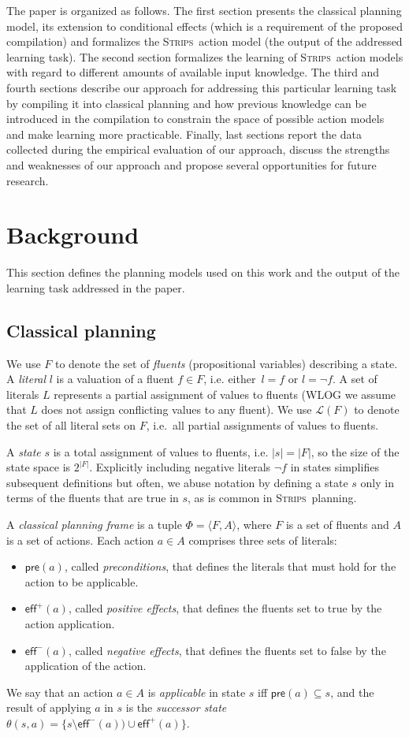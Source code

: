 \documentclass[letterpaper]{article} %
\newcommand{\tup}[1]{{\langle #1 \rangle}}
\newcommand{\pre}{\mathsf{pre}}     %
\newcommand{\eff}{\mathsf{eff}}     %
\newcommand{\strips}{\textsc{Strips}}     %
\begin{document}
The paper is organized as follows. The first section presents the classical planning model, its extension to conditional effects (which is a requirement of the proposed compilation) and formalizes the \strips\ action model (the output of the addressed learning task). The second section formalizes the learning of \strips\ action models with regard to different amounts of available input knowledge. The third and fourth sections describe our approach for addressing this particular learning task by compiling it into classical planning and how previous knowledge can be introduced in the compilation to constrain the space of possible action models and make learning more practicable. Finally, last sections report the data collected during the empirical evaluation of our approach, discuss the strengths and weaknesses of our approach and propose several opportunities for future research.


\section{Background}
This section defines the planning models used on this work and the output of the learning task addressed in the paper.

\subsection{Classical planning}
We use $F$ to denote the set of {\em fluents} (propositional variables) describing a state. A {\em literal} $l$ is a valuation of a fluent $f\in F$, i.e. either~$l=f$ or $l=\neg f$. A set of literals $L$ represents a partial assignment of values to fluents (WLOG we assume that $L$ does not assign conflicting values to any fluent). We use $\mathcal{L}(F)$ to denote the set of all literal sets on $F$, i.e.~all partial assignments of values to fluents.

A {\em state} $s$ is a total assignment of values to fluents, i.e. $|s|=|F|$, so the size of the state space is $2^{|F|}$. Explicitly including negative literals $\neg f$ in states simplifies subsequent definitions but often, we abuse notation by defining a state $s$ only in terms of the fluents that are true in $s$, as is common in \strips\ planning.

A {\em classical planning frame} is a tuple $\Phi=\tup{F,A}$, where $F$ is a set of fluents and $A$ is a set of actions. Each action $a\in A$ comprises three sets of literals:
\begin{itemize}
\item $\pre(a)$, called {\em preconditions}, that defines the literals that must hold for the action to be applicable.
\item $\eff^+(a)$, called {\em positive effects}, that defines the fluents set to true by the action application.
\item $\eff^-(a)$, called {\em negative effects}, that defines the fluents set to false by the application of the action. 
\end{itemize}
We say that an action $a\in A$ is {\em applicable} in state $s$ iff $\pre(a)\subseteq s$, and the result of applying $a$ in $s$ is the {\em successor state} $\theta(s,a)=\{s\setminus\eff^-(a))\cup\eff^+(a)\}$.
\end{document}
